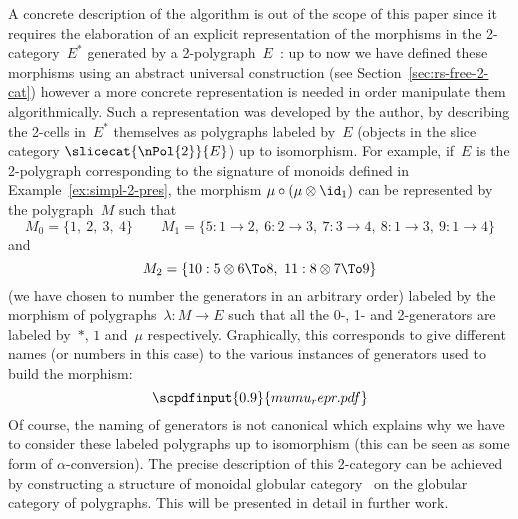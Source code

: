 \documentclass{LMCS}
\newcommand{\strid}[1]{\scpdfinput{0.9}{#1.pdf}}
\begin{document}
A concrete description of the algorithm is out of the scope of this paper since
it requires the elaboration of an explicit representation of the morphisms in the
2-category~$E^*$ generated by a 2-polygraph~$E$~\cite{mimram:critical-pairs,
  mimram:2-cp}: up to now we have defined these morphisms using an abstract
universal construction (see Section~\ref{sec:rs-free-2-cat}) however a more
concrete representation is needed in order manipulate them algorithmically. Such
a representation was developed by the author, by describing the 2-cells in~$E^*$
themselves as polygraphs labeled by~$E$ (\ie objects in the slice category
$\slicecat{\nPol{2}}{E}$) up to isomorphism. For example, if~$E$ is the
2-polygraph corresponding to the signature of monoids defined in
Example~\ref{ex:simpl-2-pres}, the morphism $\mu\circ(\mu\otimes\id_1)$ can be
represented by the polygraph~$M$ such that
\[
M_0=\{1,\ 2,\ 3,\ 4\}
\qquad
M_1=\{5:1\to 2,\ 6:2\to 3,\ 7:3\to 4,\ 8:1\to 3,\ 9:1\to 4\}
\]
and
\[
M_2=\{10:5\otimes 6\To 8,\ 11:8\otimes 7\To 9\}
\]
(we have chosen to number the generators in an arbitrary order) labeled by the
morphism of polygraphs~$\lambda:M\to E$ such that all the 0-, 1- and
2-generators are labeled by~$*$, $1$ and~$\mu$ respectively. Graphically, this
corresponds to give different names (or numbers in this case) to the various
instances of generators used to build the morphism:
\[
\strid{mumu_repr}
\]
Of course, the naming of generators is not canonical which explains why we have
to consider these labeled polygraphs up to isomorphism (this can be seen as
some form of $\alpha$-conversion). The precise description of this 2-category
can be achieved by constructing a structure of monoidal globular
category~\cite{batanin:mon-glob-cat} on the globular category of
polygraphs. This will be presented in detail in further work.

\bigskip
\end{document}
